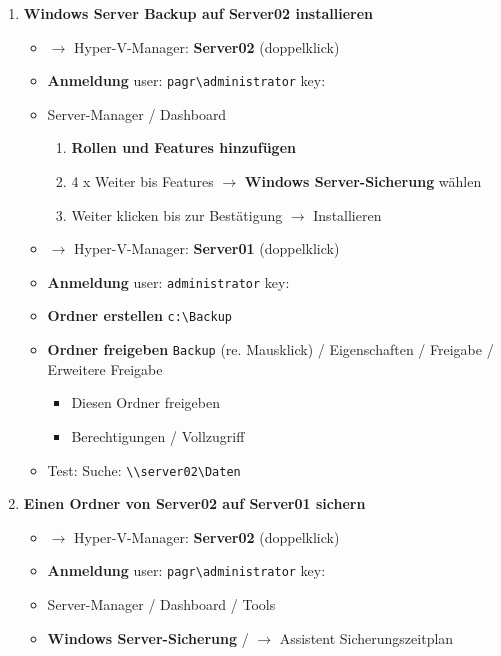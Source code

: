 \begin{enumerate}
\item
  \textbf{Windows Server Backup auf Server02 installieren}

  \begin{itemize}
  \item
    $\to$ Hyper-V-Manager: \textbf{Server02} (doppelklick)
  \item
    \textbf{Anmeldung} user:
    \verb|pagr\administrator| key:
  \item
    Server-Manager / Dashboard

    \begin{enumerate}
    \def\labelenumii{\arabic{enumii}.}
    \item
      \textbf{Rollen und Features hinzufügen}
    \item
      4 x Weiter bis Features $\to$ \textbf{Windows Server-Sicherung}
      wählen
    \item
      Weiter klicken bis zur Bestätigung $\to$ Installieren
    \end{enumerate}
  \item
    $\to$ Hyper-V-Manager: \textbf{Server01} (doppelklick)
  \item
    \textbf{Anmeldung} user: \verb|administrator|
    key:
  \item
    \textbf{Ordner erstellen} \verb|c:\Backup|
  \item
    \textbf{Ordner freigeben} \verb|Backup| (re.
    Mausklick) / Eigenschaften / Freigabe / Erweitere Freigabe

    \begin{itemize}
    \item
      Diesen Ordner freigeben
    \item
      Berechtigungen / Vollzugriff
    \end{itemize}
  \item
    Test: Suche: \verb|\\server02\Daten|
  \end{itemize}
\item
  \textbf{Einen Ordner von Server02 auf Server01 sichern}

  \begin{itemize}
  \item
    $\to$ Hyper-V-Manager: \textbf{Server02} (doppelklick)
  \item
    \textbf{Anmeldung} user:
    \verb|pagr\administrator| key:
  \item
    Server-Manager / Dashboard / Tools
  \item
    \textbf{Windows Server-Sicherung} / $\to$ Assistent
    Sicherungszeitplan


\end{itemize}
\end{enumerate}
